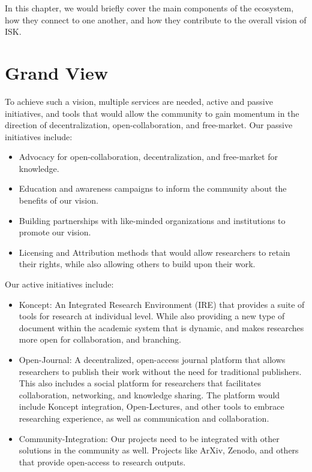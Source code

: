 \documentclass[11pt]{book}
\begin{document}
    In this chapter, we would briefly cover the main components of the ecosystem, how they connect to one another, and how they contribute to the overall vision of ISK\@.

    \section{Grand View}\label{sec:grand-view}
    To achieve such a vision, multiple services are needed, active and passive initiatives, and tools that would allow the community to gain momentum in the direction of decentralization, open-collaboration, and free-market.
    Our passive initiatives include:
    \begin{itemize}
        \item Advocacy for open-collaboration, decentralization, and free-market for knowledge.
        \item Education and awareness campaigns to inform the community about the benefits of our vision.
        \item Building partnerships with like-minded organizations and institutions to promote our vision.
        \item Licensing and Attribution methods that would allow researchers to retain their rights, while also allowing others to build upon their work.
    \end{itemize}
    Our active initiatives include:
    \begin{itemize}
        \item Koncept: An Integrated Research Environment (IRE) that provides a suite of tools for research at individual level.
        While also providing a new type of document within the academic system that is dynamic, and makes researches more open for collaboration, and branching.
        \item Open-Journal: A decentralized, open-access journal platform that allows researchers to publish their work without the need for traditional publishers.
        This also includes a social platform for researchers that facilitates collaboration, networking, and knowledge sharing.
        The platform would include Koncept integration, Open-Lectures, and other tools to embrace researching experience, as well as communication and collaboration.
        \item Community-Integration: Our projects need to be integrated with other solutions in the community as well.
        Projects like ArXiv, Zenodo, and others that provide open-access to research outputs.
    \end{itemize}
\end{document}
